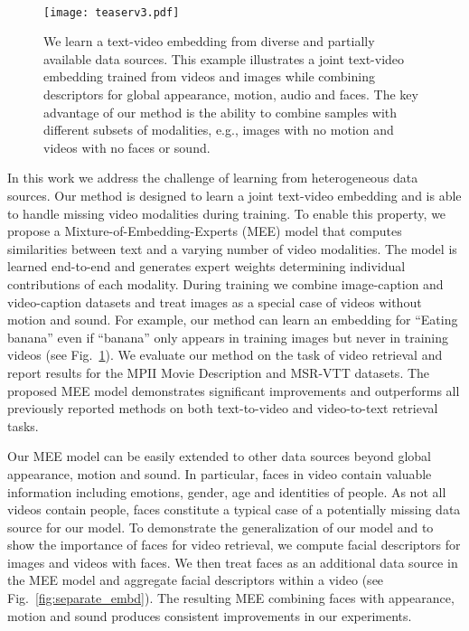 \documentclass[runningheads]{llncs}
\begin{document}
\begin{figure}[t]
  \begin{center}
    \mbox{}\vspace{.2cm}\\
     \texttt{[image: teaserv3.pdf]}
\end{center}
\caption{\small We learn a text-video embedding from diverse and partially available data sources. This example illustrates a joint text-video embedding trained from videos and images while combining descriptors for global appearance, motion, audio and faces. The key advantage of our method is the ability to combine samples with different subsets of modalities, e.g., images with no motion and videos with no faces or sound.}
\label{fig:teaser}
\end{figure}


In this work we address the challenge of learning from heterogeneous data sources.
Our method is designed to learn a joint text-video embedding and is able to handle missing video modalities during training.
To enable this property, we propose a Mixture-of-Embedding-Experts (MEE) model that computes similarities between text and a varying number of video modalities.
The model is learned end-to-end and generates expert weights determining individual contributions of each modality.
During training we combine image-caption and video-caption datasets and treat images as a special case of videos without motion and sound.
For example, our method can learn an embedding for ``Eating banana'' even if ``banana'' only appears in training images but never in training videos (see Fig.~\ref{fig:teaser}).
We evaluate our method on the task of video retrieval and report results for the MPII Movie Description and MSR-VTT datasets.
The proposed MEE model demonstrates significant improvements and outperforms all previously reported methods on both text-to-video and video-to-text retrieval tasks.

Our MEE model can be easily extended to other data sources beyond global appearance, motion and sound.
In particular, faces in video contain valuable information including emotions, gender, age and identities of people.
As not all videos contain people, faces constitute a typical case of a potentially missing data source for our model.
To demonstrate the generalization of our model and to show the importance of faces for video retrieval, we compute facial descriptors for images and videos with faces.
We then treat faces as an additional data source in the MEE model and aggregate facial descriptors within a video (see Fig.~\ref{fig:separate_embd}).
The resulting MEE combining faces with appearance, motion and sound produces consistent improvements in our experiments.
\end{document}
